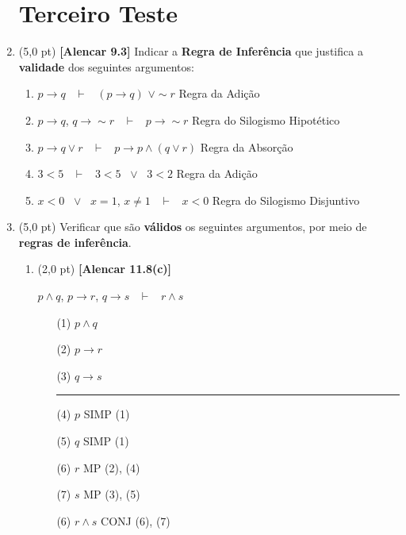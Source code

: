 \documentclass[12pt,a4paper,oneside]{article}
\begin{document}
\begin{enumerate}
	
	\section*{Terceiro Teste}
	
	\item (5,0 pt) {\bf [Alencar 9.3]} Indicar a {\bf Regra de Inferência} que justifica a {\bf validade} dos seguintes argumentos:
	\begin{enumerate}
		\item $p \rightarrow q$ \ $\vdash$ \ $(p \rightarrow q)$ $\vee \sim r$ \hspace*{0.5cm} {\color{blue} Regra da Adição}
		\item $p \rightarrow q$, $q \rightarrow \sim r$ \ $\vdash$ \ $p \rightarrow \sim r$ \hspace*{0.5cm} {\color{blue} Regra do Silogismo Hipotético}
		\item $p \rightarrow q \vee r$ \ $\vdash$ \ $p \rightarrow p \wedge (q \vee r)$ \hspace*{0.5cm} {\color{blue} Regra da Absorção}
		\item $3 <5$ \ $\vdash$ \ $3<5$ \ $\vee$ \ $3<2$ \hspace*{0.5cm} {\color{blue} Regra da Adição}
		\item $x < 0$ \ $\vee$ \ $x=1$, $x \not=1$ \ $\vdash$ \ $x <0$ \hspace*{0.5cm} {\color{blue} Regra do Silogismo Disjuntivo}
	\end{enumerate}
	
	\item (5,0 pt) Verificar que são {\bf válidos} os seguintes argumentos, por meio de {\bf regras de inferência}.
	\begin{enumerate}
		\item (2,0 pt) {\bf [Alencar 11.8(c)]}
		\begin{center}
			$p \wedge q$, $p \rightarrow r$, $q \rightarrow s$ \ $\vdash$ \ $r \wedge s$
		\end{center}
		{\color{blue}
			\begin{itemize}
				\item[(1)] $p \wedge q$ 
				\item[(2)] $p \rightarrow r$
				\item[(3)] $q \rightarrow s$ \\
				\rule{3cm}{0.5pt}
				\item[(4)] $p$ \hspace*{1.1cm} SIMP (1)
				\item[(5)] $q$ \hspace*{1.1cm} SIMP (1)
				\item[(6)] $r$ \hspace*{1.1cm} MP (2), (4)
				\item[(7)] $s$ \hspace*{1.1cm} MP (3), (5)
				\item[(6)] $r \wedge s$ \hspace*{0.5cm} CONJ (6), (7)
			\end{itemize}
		}
		\vspace*{0.3cm}
		

\end{enumerate}
\end{enumerate}
\end{document}
